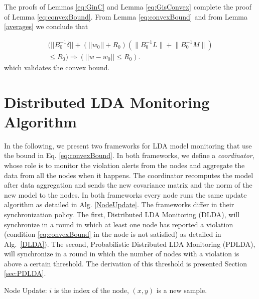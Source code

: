 \begin{corollary}
The proofs of Lemmas \ref{eq:GinC} and Lemma \ref{eq:GisConvex} complete the proof of Lemma \ref{eq:convexBound}. From Lemma \ref{eq:convexBound} and from Lemma \ref{averages} we conclude that

\begin{equation}
\begin{split}
(||B_0^{-1}\delta|| + (||w_0||+R_0)(\Big \|B_0^{-1}L\Big \|+\Big \|B_0^{-1}M\Big \|) \\
 \leq R_0) \Rightarrow (||w-w_0|| \leq R_0).
\end{split}
\end{equation}
which validates the convex bound.
\end{corollary}
%
%


\section{Distributed LDA Monitoring Algorithm}
In the following, we present two frameworks for LDA model monitoring that use
the bound in Eq. \ref{eq:convexBound}. 
In both frameworks, 
we define a \textit{coordinator}, whose role is to monitor the violation alerts from the nodes and aggregate the data from all the nodes when it happens. The coordinator recomputes the model after data aggregation and sends the new covariance matrix and the norm of the new model to the nodes.
In both frameworks every node runs the same
update algorithm as detailed in Alg. \ref{NodeUpdate}.
The frameworks differ in their synchronization policy. 
The first, Distributed LDA Monitoring (DLDA), will synchronize in a round
in which at least one node has reported a violation (condition \ref{eq:convexBound} in the node is not satisfied) as detailed in Alg.~\ref{DLDA}).
The second, Probabilistic Distributed LDA Monitoring (PDLDA), will synchronize in a round in which the number of nodes with a violation is above a certain
threshold.
The derivation of this threshold is presented Section \ref{sec:PDLDA}.

\begin{algorithm}
\caption{Node Update: $i$ is the index of the node, $(x,y)$ is a new sample.}
\label{NodeUpdate}
\end{algorithm}

